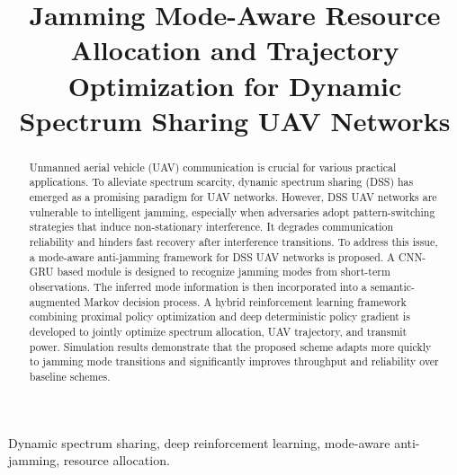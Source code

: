 \documentclass[conference]{IEEEtran}
\begin{document}
\title{Jamming Mode-Aware Resource Allocation and Trajectory Optimization for Dynamic Spectrum Sharing UAV Networks}

\author{
}
\maketitle

\begin{abstract}
Unmanned aerial vehicle (UAV) communication is crucial for various practical applications. 
To alleviate spectrum scarcity, dynamic spectrum sharing (DSS) has emerged as a promising paradigm for UAV networks. 
However, DSS UAV networks are vulnerable to intelligent jamming, 
especially when adversaries adopt pattern-switching strategies that induce non-stationary interference. 
It degrades communication reliability and hinders fast recovery after interference transitions. 
To address this issue, a mode-aware anti-jamming framework for DSS UAV networks is proposed.
A CNN-GRU based module is designed to recognize jamming modes from short-term observations. 
The inferred mode information is then incorporated into a semantic-augmented Markov decision process. 
A hybrid reinforcement learning framework combining proximal policy optimization and deep deterministic policy gradient is developed to jointly optimize spectrum allocation, 
UAV trajectory, and transmit power. 
Simulation results demonstrate that the proposed scheme adapts more quickly to jamming mode transitions and significantly improves throughput and reliability over baseline schemes.
\end{abstract}

\begin{IEEEkeywords}
Dynamic spectrum sharing, deep reinforcement learning, mode-aware anti-jamming, resource allocation.
\end{IEEEkeywords}
\end{document}
